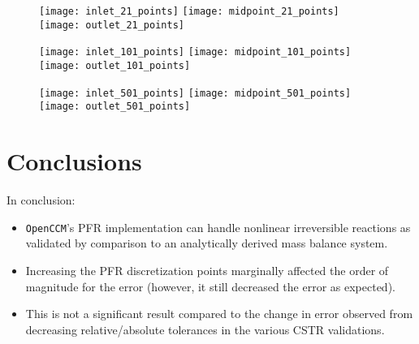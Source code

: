 \documentclass[a4paper,12pt]{article}
\begin{document}
\begin{figure}[H] %
    \texttt{[image: inlet\_21\_points]}\hfill
    \texttt{[image: midpoint\_21\_points]}\hfill
    \texttt{[image: outlet\_21\_points]}
\end{figure}
\vspace{-10pt}
\begin{figure}[H] %
    \texttt{[image: inlet\_101\_points]}\hfill
    \texttt{[image: midpoint\_101\_points]}\hfill
    \texttt{[image: outlet\_101\_points]}
\end{figure}
\vspace{-10pt}
\begin{figure}[H] %
    \texttt{[image: inlet\_501\_points]}\hfill
    \texttt{[image: midpoint\_501\_points]}\hfill
    \texttt{[image: outlet\_501\_points]}
\end{figure}

\section{Conclusions}

In conclusion:
\begin{itemize}
	\item \texttt{OpenCCM}'s PFR implementation can handle nonlinear irreversible reactions as validated by comparison to an analytically derived mass balance system. 
	\item Increasing the PFR discretization points marginally affected the order of magnitude for the error (however, it still decreased the error as expected). 
	\item This is not a significant result compared to the change in error observed from decreasing relative/absolute tolerances in the various CSTR validations. 
\end{itemize}
\end{document}
